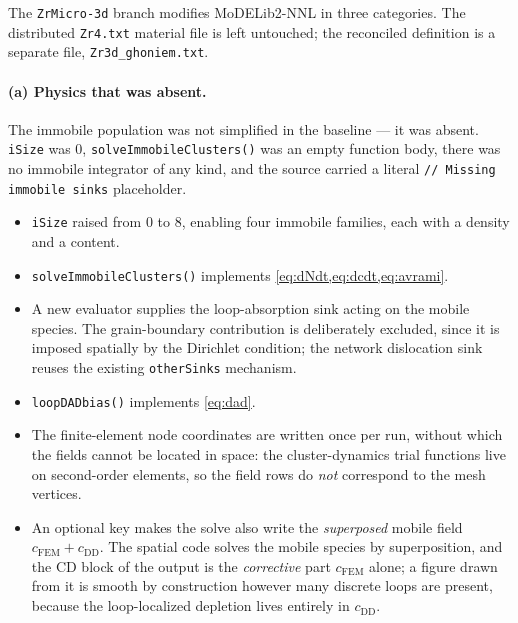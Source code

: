 \documentclass{article}
\newcommand{\ZrM}{\texttt{ZrMicro-3d}}
\newcommand{\MoD}{\textsf{MoDELib2-NNL}}
\begin{document}
The \ZrM{} branch modifies \MoD{} in three categories. The distributed
\texttt{Zr4.txt} material file is left untouched; the reconciled definition is a
separate file, \texttt{Zr3d\_ghoniem.txt}.

\paragraph*{(a) Physics that was absent.}
The immobile population was not simplified in the baseline --- it was absent.
\texttt{iSize} was $0$, \texttt{solveImmobileClusters()} was an empty function
body, there was no immobile integrator of any kind, and the source carried a
literal \texttt{// Missing immobile sinks} placeholder.
\begin{itemize}
\item \texttt{iSize} raised from $0$ to $8$, enabling four immobile families,
each with a density and a content.
\item \texttt{solveImmobileClusters()} implements
\cref{eq:dNdt,eq:dcdt,eq:avrami}.
\item A new evaluator supplies the loop-absorption sink acting on the mobile
species. The grain-boundary contribution is deliberately excluded, since it is
imposed spatially by the Dirichlet condition; the network dislocation sink
reuses the existing \texttt{otherSinks} mechanism.
\item \texttt{loopDADbias()} implements \cref{eq:dad}.
\item The finite-element node coordinates are written once per run, without
which the fields cannot be located in space: the cluster-dynamics trial functions
live on second-order elements, so the field rows do \emph{not} correspond to the
mesh vertices.
\item An optional key makes the solve also write the \emph{superposed} mobile
field $c_{\mathrm{FEM}}+c_{\mathrm{DD}}$. The spatial code solves the mobile
species by superposition, and the CD block of the output is the \emph{corrective}
part $c_{\mathrm{FEM}}$ alone; a figure drawn from it is smooth by construction
however many discrete loops are present, because the loop-localized depletion
lives entirely in $c_{\mathrm{DD}}$.
\end{itemize}
\end{document}
